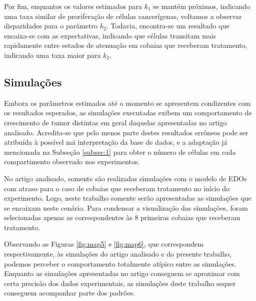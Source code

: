 \documentclass[12pt]{article}
\begin{document}
Por fim, enquantos os valores estimados para \(k_1\) se mantém próximos, indicando uma taxa similar de proriferação de células cancerígenas, voltamos a observar disparidades para o parâmetro \(k_2\). Todavia, encontra-se um resultado que encaixa-se com as expectativas, indicando que células transitam mais rapidamente entre estados de atenuação em cobaias que receberam tratamento, indicando uma taxa maior para \(k_2\).

\subsection{Simulações}

Embora os parâmetros estimados até o momento se apresentem condizentes com os resultados esperados, as simulações executadas exibem um comportamento de crescimento de tumor distintas em geral daquelas apresentadas no artigo analisado. Acredita-se que pelo menos parte destes resultados errôneos pode ser atribuída à possível má interpretação da base de dados, e a adaptação já mencionada na Subseção \ref{subsec:1} para obter o número de células em cada compartimento observado nos experimentos.

No artigo analisado, somente são realizadas simulações com o modelo de EDOs com atraso para o caso de cobaias que receberam tratamento no início do experimento. Logo, neste trabalho somente serão apresentadas as simulações que se encaixam neste cenário. Para condensar a visualização das simulações, foram selecionadas apenas as correspondentes às 8 primeiras cobaias que receberam tratamento.

Observando as Figuras \ref{fig:map5} e \ref{fig:map6}, que correspondem respectivamente, às simulações do artigo analisado e do presente trabalho, podemos perceber o comportamento totalmente atípico entre as simulações. Enquanto as simulações apresentadas no artigo conseguem se aproximar com certa precisão dos dados experimentais, as simulações deste trabalho sequer conseguem acompanhar parte dos padrões.
\end{document}
